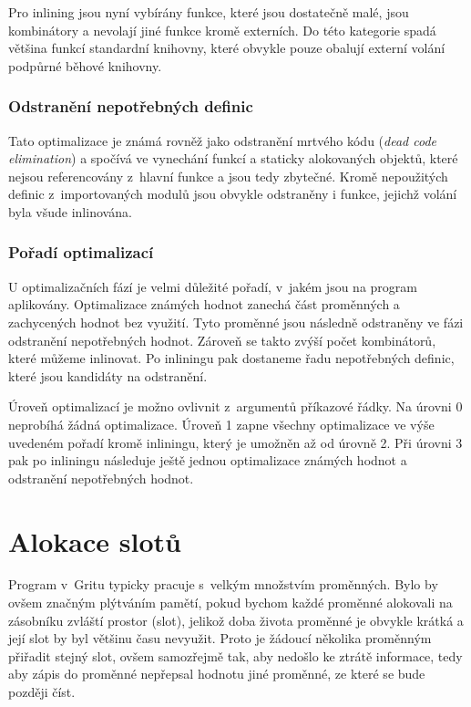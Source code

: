 Pro inlining jsou nyní vybírány funkce, které jsou dostatečně malé, jsou
kombinátory a nevolají jiné funkce kromě externích. Do této kategorie spadá
většina funkcí standardní knihovny, které obvykle pouze obalují externí volání
podpůrné běhové knihovny.

\subsubsection{Odstranění nepotřebných definic}

Tato optimalizace je známá rovněž jako odstranění mrtvého kódu (\emph{dead code
elimination}) a spočívá ve vynechání funkcí a staticky alokovaných objektů,
které nejsou referencovány z~hlavní funkce a jsou tedy zbytečné. Kromě
nepoužitých definic z~importovaných modulů jsou obvykle odstraněny i funkce,
jejichž volání byla všude inlinována.

\subsubsection{Pořadí optimalizací}

U optimalizačních fází je velmi důležité pořadí, v~jakém jsou na program
aplikovány. Optimalizace známých hodnot zanechá část proměnných a zachycených
hodnot bez využití. Tyto proměnné jsou následně odstraněny ve fázi odstranění
nepotřebných hodnot. Zároveň se takto zvýší počet kombinátorů, které můžeme
inlinovat. Po inliningu pak dostaneme řadu nepotřebných definic, které jsou
kandidáty na odstranění.

Úroveň optimalizací je možno ovlivnit z~argumentů příkazové řádky. Na úrovni 0
neprobíhá žádná optimalizace. Úroveň 1 zapne všechny optimalizace ve výše
uvedeném pořadí kromě inliningu, který je umožněn až od úrovně 2. Při úrovni 3
pak po inliningu následuje ještě jednou optimalizace známých hodnot a odstranění
nepotřebných hodnot.

\section{Alokace slotů}

Program v~Gritu typicky pracuje s~velkým množstvím proměnných. Bylo by ovšem
značným plýtváním pamětí, pokud bychom každé proměnné alokovali na zásobníku
zvláští prostor (slot), jelikož doba života proměnné je obvykle krátká a její
slot by byl většinu času nevyužit. Proto je žádoucí několika proměnným přiřadit
stejný slot, ovšem samozřejmě tak, aby nedošlo ke ztrátě informace, tedy aby
zápis do proměnné nepřepsal hodnotu jiné proměnné, ze které se bude později
číst.

